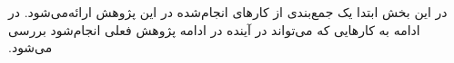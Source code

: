 
در این بخش ابتدا یک جمع‌بندی از کار‌های انجام‌شده در این پژوهش ارائه‌می‌شود. در ادامه به کار‌هایی که می‌تواند در آینده در ادامه پژوهش فعلی انجام‌شود بررسی می‌شود.
‫
‫

‫
‫





\pagebreak